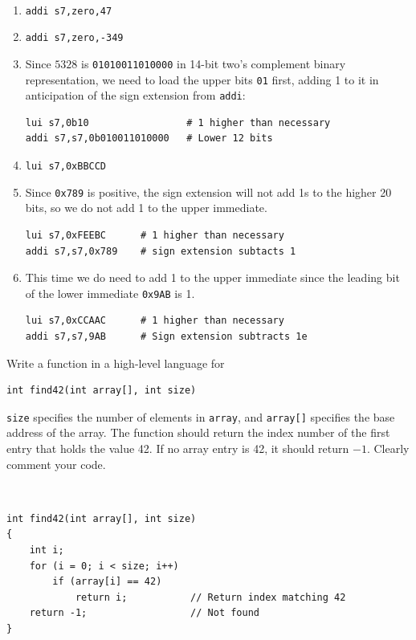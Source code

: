 \documentclass[12pt]{article}
\newenvironment{ex}[2][Exercise]{\begin{trivlist}
		\item[\hskip \labelsep {\bfseries #1}\hskip \labelsep {\bfseries #2.}]}{\end{trivlist}}
\newenvironment{sol}[1][Solution]{\begin{trivlist}
		\item[\hskip \labelsep {\bfseries #1:}]}{\end{trivlist}}
\begin{document}
\begin{sol}
	\
	\begin{enumerate}[label=(\alph*)]
		\item \texttt{addi s7,zero,47}
		\item \texttt{addi s7,zero,-349}
		\item Since $5328$ is \texttt{01010011010000} in 14-bit two's
		complement binary representation, we need to load the upper
		bits \texttt{01} first, adding 1 to it in anticipation of the
		sign extension from \texttt{addi}:
		\begin{lstlisting}[language={}]
lui s7,0b10					# 1 higher than necessary
addi s7,s7,0b010011010000	# Lower 12 bits
		\end{lstlisting}
		\item \texttt{lui s7,0xBBCCD}
		\item Since \texttt{0x789} is positive, the sign extension
		will not add 1s to the higher 20 bits, so we do not add 1
		to the upper immediate.
		\
		\begin{lstlisting}[language={}]
lui s7,0xFEEBC		# 1 higher than necessary
addi s7,s7,0x789	# sign extension subtacts 1
		\end{lstlisting}
		\item This time we do need to add 1 to the upper immediate
		since the leading bit of the lower immediate \texttt{0x9AB} is 1.
		\
		\begin{lstlisting}[language={}]
lui s7,0xCCAAC		# 1 higher than necessary
addi s7,s7,9AB		# Sign extension subtracts 1e
		\end{lstlisting}
	\end{enumerate}
\end{sol}

\begin{ex}{6.15}
	Write a function in a high-level language for
	\begin{lstlisting}
int find42(int array[], int size)
	\end{lstlisting}
	\texttt{size} specifies the number of elements in \texttt{array}, and
	\texttt{array[]} specifies the base address of the array. The function
	should return the index number of the first entry that holds the value
	42. If no array entry is 42, it should return $-1$. Clearly comment your
	code.
\end{ex}

\begin{sol}
	\
	\begin{lstlisting}
int find42(int array[], int size)
{
	int i;
	for (i = 0; i < size; i++)
		if (array[i] == 42)
			return i;			// Return index matching 42
	return -1;					// Not found
}
	\end{lstlisting}
\end{sol}
\end{document}
